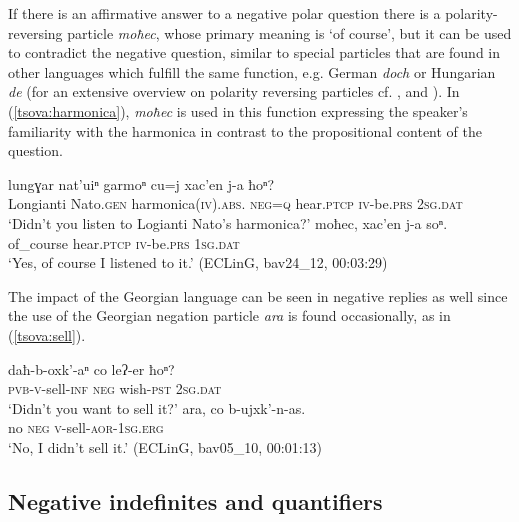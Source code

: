 \documentclass[output=paper,%
colorlinks,citecolor=brown,
showindex
]{langscibook}
\begin{document}
If there is an affirmative answer to a negative polar question there is a polarity-reversing particle \textit{moħec}, whose primary meaning is `of course', but it can be used to contradict the negative question, similar to special particles that are found in other languages which fulfill the same function, e.g. German \textit{doch} or Hungarian \textit{de} (for an extensive overview on polarity reversing particles cf. \citealt{Holmberg2016}, and \citealt{Moser2019}). In (\ref{tsova:harmonica}), \textit{moħec} is used in this function expressing the speaker's familiarity with the harmonica in contrast to the propositional content of the question.

\ea	\label{tsova:harmonica}
    \begin{xlist}[Q: ]
        \gll 	lungɣar nat'uiⁿ garmoⁿ cu=j xac'en j-a ħoⁿ? \\  
        	 Longianti Nato.\textsc{gen} harmonica(\textsc{iv}).\textsc{abs}. \textsc{neg=q} hear.\textsc{ptcp} \textsc{iv}-be.\textsc{prs} \textsc{2sg.dat} \\	
        \glt `Didn't you listen to Logianti Nato's harmonica?'
        \gll moħec, xac'en j-a soⁿ.\\  
        	of\_course hear.\textsc{ptcp} \textsc{iv}-be.\textsc{prs} \textsc{1sg.dat}\\	
        \glt `Yes, of course I listened to it.' (ECLinG, bav24\_12, 00:03:29)
    \end{xlist}
\z 

The impact of the Georgian language can be seen in negative replies as well since the use of the Georgian negation particle \textit{ara} is found occasionally, as in (\ref{tsova:sell}).

\ea	\label{tsova:sell}
\begin{xlist}[Q: ]
        \gll 	 	daħ-b-oxk’-aⁿ	co	leʔ-er	ħoⁿ?	 \\  
        	 \textsc{pvb-v}-sell-\textsc{inf} \textsc{neg} wish-\textsc{pst} \textsc{2sg.dat}\\	
        \glt `Didn’t you want to sell it?'
        \gll ara,	co	b-ujxk’-n-as.\\  
        	no \textsc{neg} \textsc{v}-sell-\textsc{aor-1sg.erg}\\	
        \glt `No, I didn’t sell it.' (ECLinG, bav05\_10, 00:01:13)
    \end{xlist}
\z

\subsection{Negative indefinites and quantifiers}
\label{tsova:pronouns}
\end{document}
